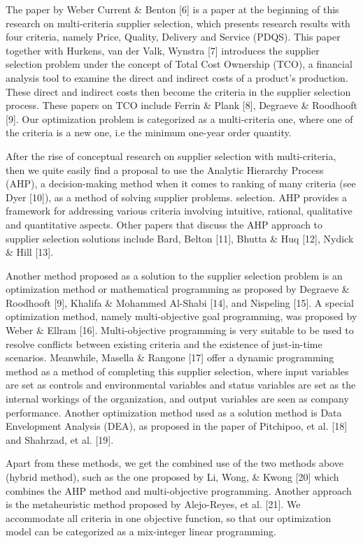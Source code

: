\documentclass[preprint, 3p,
authoryear]{elsarticle} %
\begin{document}
The paper by Weber Current \& Benton {[}6{]} is a paper at the beginning
of this research on multi-criteria supplier selection, which presents
research results with four criteria, namely Price, Quality, Delivery and
Service (PDQS). This paper together with Hurkens, van der Valk, Wynstra
{[}7{]} introduces the supplier selection problem under the concept of
Total Cost Ownership (TCO), a financial analysis tool to examine the
direct and indirect costs of a product's production. These direct and
indirect costs then become the criteria in the supplier selection
process. These papers on TCO include Ferrin \& Plank {[}8{]}, Degraeve
\& Roodhooft {[}9{]}. Our optimization problem is categorized as a
multi-criteria one, where one of the criteria is a new one, i.e the
minimum one-year order quantity.

After the rise of conceptual research on supplier selection with
multi-criteria, then we quite easily find a proposal to use the Analytic
Hierarchy Process (AHP), a decision-making method when it comes to
ranking of many criteria (see Dyer {[}10{]}), as a method of solving
supplier problems. selection. AHP provides a framework for addressing
various criteria involving intuitive, rational, qualitative and
quantitative aspects. Other papers that discuss the AHP approach to
supplier selection solutions include Bard, Belton {[}11{]}, Bhutta \&
Huq {[}12{]}, Nydick \& Hill {[}13{]}.

Another method proposed as a solution to the supplier selection problem
is an optimization method or mathematical programming as proposed by
Degraeve \& Roodhooft {[}9{]}, Khalifa \& Mohammed Al-Shabi {[}14{]},
and Nispeling {[}15{]}. A special optimization method, namely
multi-objective goal programming, was proposed by Weber \& Ellram
{[}16{]}. Multi-objective programming is very suitable to be used to
resolve conflicts between existing criteria and the existence of
just-in-time scenarios. Meanwhile, Masella \& Rangone {[}17{]} offer a
dynamic programming method as a method of completing this supplier
selection, where input variables are set as controls and environmental
variables and status variables are set as the internal workings of the
organization, and output variables are seen as company performance.
Another optimization method used as a solution method is Data
Envelopment Analysis (DEA), as proposed in the paper of Pitchipoo, et
al. {[}18{]} and Shahrzad, et al. {[}19{]}.

Apart from these methods, we get the combined use of the two methods
above (hybrid method), such as the one proposed by Li, Wong, \& Kwong
{[}20{]} which combines the AHP method and multi-objective programming.
Another approach is the metaheuristic method proposed by Alejo-Reyes, et
al. {[}21{]}. We accommodate all criteria in one objective function, so
that our optimization model can be categorized as a mix-integer linear
programming.
\end{document}
